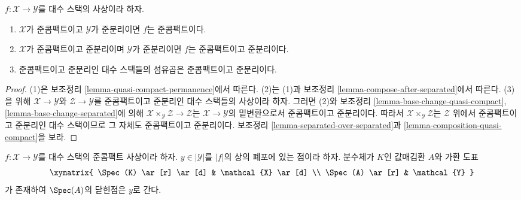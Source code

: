 \begin{lemma}
\label{lemma-quasi-compact-quasi-separated-permanence}
$f : \mathcal{X} \to \mathcal{Y}$를 대수 스택의 사상이라 하자.
\begin{enumerate}
\item $\mathcal{X}$가 준콤팩트이고 $\mathcal{Y}$가 준분리이면
$f$는 준콤팩트이다.
\item $\mathcal{X}$가 준콤팩트이고 준분리이며 $\mathcal{Y}$가
준분리이면 $f$는 준콤팩트이고 준분리이다.
\item 준콤팩트이고 준분리인 대수 스택들의 섬유곱은 준콤팩트이고 준분리이다.
\end{enumerate}
\end{lemma}

\begin{proof}
(1)은 보조정리 \ref{lemma-quasi-compact-permanence}에서 따른다.
(2)는 (1)과 보조정리 \ref{lemma-compose-after-separated}에서 따른다.
(3)을 위해 $\mathcal{X} \to \mathcal{Y}$와
$\mathcal{Z} \to \mathcal{Y}$를 준콤팩트이고 준분리인 대수 스택들의
사상이라 하자. 그러면 (2)와 보조정리
\ref{lemma-base-change-quasi-compact},
\ref{lemma-base-change-separated}에 의해
$\mathcal{X} \times_\mathcal{Y} \mathcal{Z} \to \mathcal{Z}$는
$\mathcal{X} \to \mathcal{Y}$의 밑변환으로서 준콤팩트이고 준분리이다.
따라서 $\mathcal{X} \times_\mathcal{Y} \mathcal{Z}$는
$\mathcal{Z}$ 위에서 준콤팩트이고 준분리인 대수 스택이므로 그 자체도
준콤팩트이고 준분리이다. 보조정리
\ref{lemma-separated-over-separated}과
\ref{lemma-composition-quasi-compact}을 보라.
\end{proof}

\begin{lemma}
\label{lemma-reach-points-scheme-theoretic-image}
$f : \mathcal{X} \to \mathcal{Y}$를 대수 스택의 준콤팩트 사상이라 하자.
$y \in |\mathcal{Y}|$를 $|f|$의 상의 폐포에 있는 점이라 하자.
분수체가 $K$인 값매김환 $A$와 가환 도표
$$
\xymatrix{
\Spec(K) \ar[r] \ar[d] & \mathcal{X} \ar[d] \\
\Spec(A) \ar[r] & \mathcal{Y}
}
$$
가 존재하여 $\Spec(A)$의 닫힌점은 $y$로 간다.
\end{lemma}

